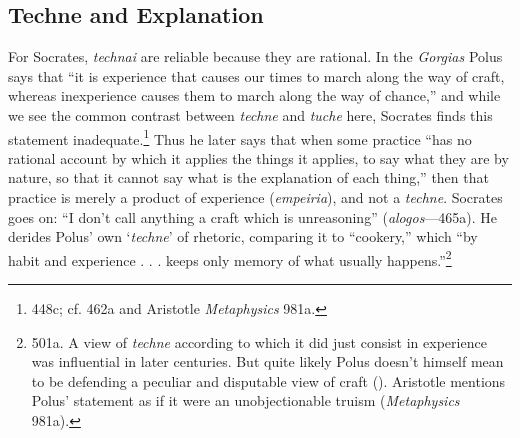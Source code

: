 ﻿\documentclass[11pt]{amsart}
\begin{document}










\subsection{Techne and Explanation} For Socrates, \emph{technai} are reliable because they are rational. In the \emph{Gorgias} Polus says that ``it is experience that causes our times to march along the way of craft, whereas inexperience causes them to march along the way of chance,'' and while we see the common contrast between \emph{techne} and \emph{tuche} here, Socrates finds this statement inadequate.\footnote{448c; cf. 462a and Aristotle \emph{Metaphysics} 981a.} Thus he later says that when some practice ``has no rational account by which it applies the things it applies, to say what they are by nature, so that it cannot say what is the explanation of each thing,'' then that practice is merely a product of experience (\emph{empeiria}), and not a \emph{techne}. Socrates goes on: ``I don't call anything a craft which is unreasoning'' (\emph{alogos}---465a). He derides Polus' own `\emph{techne}' of rhetoric, comparing it to ``cookery,'' which ``by habit and experience . . . keeps only memory of what usually happens.''\footnote{501a. A view of \emph{techne} according to which it did just consist in experience was influential in later centuries. But quite likely Polus doesn't himself mean to be defending a peculiar and disputable view of craft (\citet[346--8]{schiefsky2005}). Aristotle mentions Polus' statement as if it were an unobjectionable truism (\emph{Metaphysics} 981a).}

\end{document}
